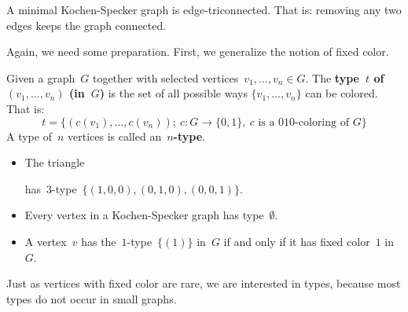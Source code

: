 \documentclass{report}
\newcommand{\keyword}[1]{\textbf{#1}}
\begin{document}
\begin{proposition}\label{prop:ks-triconn}
    A minimal Kochen-Specker graph is edge-triconnected.
    That is: removing any two edges keeps the graph connected.
\end{proposition}
Again, we need some preparation.  First, we generalize
the notion of fixed color.
\begin{definition}
   Given a graph~$G$ together with selected vertices~$v_1, \ldots, v_n \in G$.
   The \keyword{type~$t$ of~$(v_1,\ldots,v_n)$ (in~$G$)}
   is the set of all possible ways $\{v_1, \ldots, v_n\}$ can be colored.
        That is:
\begin{equation*}
  t = \bigl\{ (c(v_1), \ldots, c(v_n)); \ 
        c \colon G \to \{0,1\},\ 
        \text{$c$ is a $010$-coloring of~$G$} \bigr\}
\end{equation*}
    A type of~$n$ vertices is
    called an~\keyword{$n$-type}.
\end{definition}

\begin{example}
\begin{itemize}
\item The triangle~
has~$3$-type~$\{(1,0,0), (0,1,0), (0,0,1)\}$.
\item Every vertex in a Kochen-Specker graph has type~$\emptyset$.
\item
    A vertex~$v$ has the~$1$-type~$\{(1)\}$ in~$G$ if and only if
        it has fixed color~$1$ in~$G$.
\end{itemize}
\end{example}

Just as vertices with fixed color are rare,
we are interested in types,
because most types do not occur in small graphs.
\end{document}

